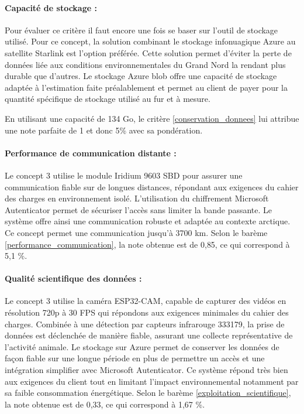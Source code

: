 \paragraph{Capacité de stockage :}
Pour évaluer ce critère il faut encore une fois se baser sur l’outil de stockage utilisé. Pour ce concept, la solution combinant le stockage infonuagique Azure au satellite Starlink est l’option préférée. Cette solution permet d’éviter la perte de données liée aux conditions environnementales du Grand Nord la rendant plus durable que d’autres. Le stockage Azure blob offre une capacité de stockage adaptée à l’estimation faite préalablement et permet au client de payer pour la quantité spécifique de stockage utilisé au fur et à mesure. 

\bigskip
En utilisant une capacité de 134 Go, le critère \ref{conservation_donnees} lui attribue une note parfaite de 1 et donc 5\% avec sa pondération. 

\paragraph{Performance de communication distante :}
Le concept 3 utilise le module Iridium 9603 SBD pour assurer une communication fiable sur de longues distances, répondant aux exigences du cahier des charges en environnement isolé.
L'utilisation du chiffrement Microsoft Autenticator permet de sécuriser l'accès sans limiter la bande passante. 
Le système offre ainsi une communication robuste et adaptée au contexte arctique.
Ce concept permet une communication jusqu'à 3700 km.
Selon le barème \ref{performance_communication}, la note obtenue est de 0,85, ce qui correspond à 5,1 \%.

\paragraph{Qualité scientifique des données :}
Le concept 3 utilise la caméra ESP32-CAM, capable de capturer des vidéos en résolution 720p à 30 FPS qui répondons aux exigences minimales du cahier des charges.
Combinée à une détection par capteurs infrarouge 333179, la prise de données est déclenchée de manière fiable, assurant une collecte représentative de l’activité animale.
Le stockage sur Azure permet de conserver les données de façon fiable sur une longue période en plus de permettre un accès et une intégration simplifier avec Microsoft Autenticator.
Ce système répond très bien aux exigences du client tout en limitant l’impact environnemental notamment par sa faible consommation énergétique.
Selon le barème \ref{exploitation_scientifique}, la note obtenue est de 0,33, ce qui correspond à 1,67 \%.


